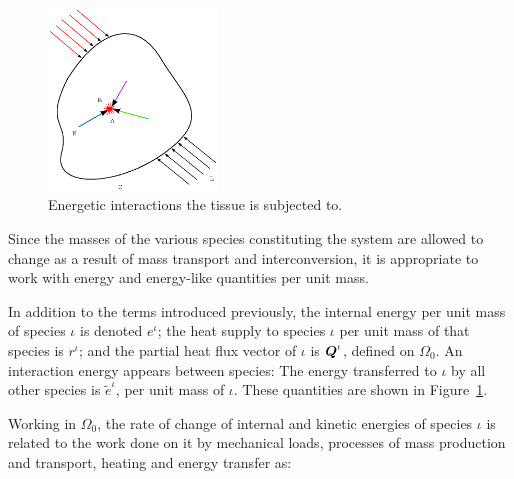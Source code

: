 \begin{figure}[ht]
  \centering
  \includegraphics[width=0.4\textwidth]{images/elucidation/cp-energy}
  \caption{Energetic interactions the tissue is subjected to.}
  \label{continuum-potato-energy}
\end{figure}

Since the masses of the various species constituting the system are
allowed to change as a result of mass transport and
interconversion, it is appropriate to work with energy and energy-like
quantities per unit mass.

In addition to the terms introduced previously, the internal energy
per unit mass of species $\iota$ is denoted $e^\iota$; the heat supply
to species $\iota$ per unit mass of that species is $r^\iota$; and the
partial heat flux vector of $\iota$ is $\mbox{\boldmath$ Q$}^\iota$, defined on
$\Omega_0$. An interaction energy appears between species: The energy
transferred to $\iota$ by all other species is $\tilde{e}^\iota$, per
unit mass of $\iota$. These quantities are shown in
Figure~\ref{continuum-potato-energy}.

Working in $\Omega_0$, the rate of change of internal and kinetic
energies of species $\iota$ is related to the work done on it by
mechanical loads, processes of mass production and transport, heating
and energy transfer as:

